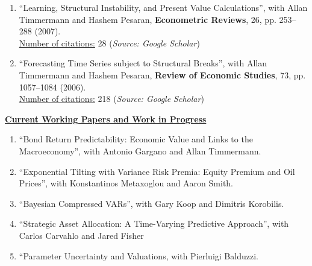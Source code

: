 \documentclass[12pt]{article}
\begin{document}
\begin{enumerate}
	\item ``Learning, Structural Instability, and Present Value Calculations'', with Allan Timmermann and Hashem Pesaran, \textbf{Econometric Reviews}, 26, pp. 253--288 (2007). \\
	\underline{Number of citations:} 28 (\emph{Source: Google Scholar})

	\item ``Forecasting Time Series subject to Structural Breaks'', with Allan Timmermann and Hashem Pesaran, \textbf{Review of Economic Studies}, 73, pp. 1057--1084 (2006). \\
	\underline{Number of citations:} 218 (\emph{Source: Google Scholar})

    \setcounter{enumTemp}{\theenumi}
 \end{enumerate}
\underline{\textbf{Current Working Papers and Work in Progress}}
\begin{enumerate}
	\setcounter{enumi}{\theenumTemp}
	\item ``Bond Return Predictability: Economic Value and Links to the Macroeconomy'', with Antonio Gargano and Allan Timmermann.
	\item ``Exponential Tilting with Variance Risk Premia: Equity Premium and Oil Prices'', with Konstantinos Metaxoglou  and Aaron Smith.
	\item ``Bayesian Compressed VARs'', with Gary Koop and Dimitris Korobilis.
	\item ``Strategic Asset Allocation: A Time-Varying Predictive Approach'', with Carlos Carvahlo and Jared Fisher 
	\item ``Parameter Uncertainty and Valuations, with Pierluigi Balduzzi.
	
\end{enumerate}
\end{document}

